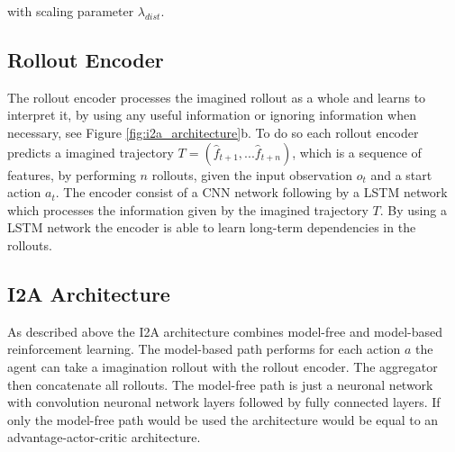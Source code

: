 with scaling parameter $\lambda_{dist}$.\\


 
\subsection{Rollout Encoder}
 

The rollout encoder processes the imagined rollout as a whole and learns to interpret it, by using any useful information or ignoring information when necessary, see Figure \ref{fig:i2a_architecture}b.
To do so each rollout encoder predicts a imagined trajectory $T = (\hat{f}_{t+1}, ... \hat{f}_{t+n})$, which is a sequence of features, by performing $n$ rollouts, given the input observation $o_t$ and a start action $a_t$.
The encoder consist of a CNN network following by a LSTM network which processes the information given by the imagined trajectory $T$. By using a LSTM network the encoder is able to learn long-term dependencies in the rollouts.\\

 
   
 
\subsection{I2A Architecture}


As described above the I2A architecture combines model-free and model-based reinforcement learning.
The model-based path performs for each action $a$ the agent can take a imagination rollout with the rollout encoder.
The aggregator then concatenate all rollouts.
The model-free path is just a neuronal network with convolution neuronal network layers followed by fully connected layers.
If only the model-free path would be used the architecture would be equal to an advantage-actor-critic architecture.\\
 

